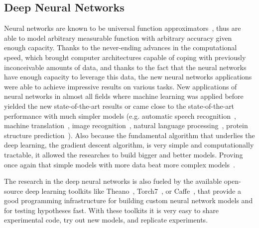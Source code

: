 \documentclass[runningheads,a4paper]{llncs}
\begin{document}
\subsection{Deep Neural Networks}
Neural networks are known to be universal function approximators~\cite{hornik1989multilayer}, thus are able to model arbitrary measurable function with arbitrary accuracy given enough capacity. Thanks to the never-ending advances in the computational speed, which brought computer architectures capable of coping with previously inconceivable amounts of data, and thanks to the fact that the neural networks have enough capacity to leverage this data, the new neural networks applications were able to achieve impressive results on various tasks. New applications of neural networks in almost all fields where machine learning was applied before yielded the new state-of-the-art results or came close to the state-of-the-art performance with much simpler models (e.g. automatic speech recognition~\cite{graves2005framewise}, machine translation~\cite{sutskever2014sequence}, image recognition~\cite{karpathy2014deep}, natural language processing~\cite{socher2012semantic}, protein structure prediction~\cite{sonderby2014protein}). Also because the fundamental algorithm that underlies the deep learning, the gradient descent algorithm, is very simple and computationally tractable, it allowed the researches to build bigger and better models. Proving once again that simple models with more data beat more complex models~\cite{halevy2009unreasonable}.

The research in the deep neural networks is also fueled by the available open-source deep learning toolkits like Theano~\cite{bastien2012theano}, Torch7~\cite{collobert2011torch7}, or Caffe~\cite{jia2014caffe}, that provide a good programming infrastructure for building custom neural network models and for testing hypotheses fast. With these toolkits it is very easy to share experimental code, try out new models, and replicate experiments.
\end{document}
